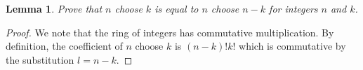 \documentclass[10pt,twocolumn]{article}
\newtheorem{lemma}[theorem]{Lemma}
\begin{document}
\begin{lemma}
Prove that $n$ choose $k$ is equal to $n$ choose $n - k$ for integers $n$ and $k$.
\end{lemma}

\begin{proof}
    We note that the ring of integers has commutative multiplication. By definition, the coefficient of $n$ choose $k$ is $(n - k)! k!$ which is commutative by the substitution $l = n - k$.
\end{proof}


\end{document}
